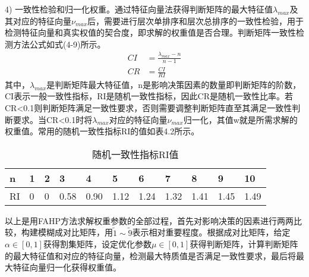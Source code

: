 4) 一致性检验和归一化权重。通过特征向量法获得判断矩阵的最大特征值$\lambda_{max}$及其对应的特征向量$\nu_{max}$后，需要进行层次单排序和层次总排序的一致性检验，用于检测特征向量和真实权值的契合度，即求解的权重值是否合理。判断矩阵一致性检测方法公式如式(4-9)所示。
\begin{equation}
\begin{split}
CI &= \frac{\lambda_{max}-n}{n-1} \\
CR &= \frac{CI}{RI}
\end{split}
\end{equation}
其中，$\lambda_{max}$是判断矩阵最大特征值，n是影响决策因素的数量即判断矩阵的阶数，CI表示一般一致性指标，RI是随机一致性指标，因此CR是随机一致性比率。若CR<0.1则判断矩阵满足一致性要求，否则需要调整判断矩阵直至其满足一致性判断要求。当CR<0.1时将$\lambda_{max}$对应的特征向量$\nu_{max}$归一化，其值w就是所需求解的权重值。常用的随机一致性指标RI的值如表4.2所示。
\begin{table}[htbp]
	\centering\dawu[1.3]
	\caption{随机一致性指标RI值}
	\begin{tabular}{|p{0.8cm}<{\centering}|p{0.8cm}<{\centering}|p{0.8cm}<{\centering}|p{0.8cm}<{\centering}|p{0.8cm}<{\centering}|p{0.8cm}<{\centering}|p{0.8cm}<{\centering}|p{0.8cm}<{\centering}|p{0.8cm}<{\centering}|p{0.8cm}<{\centering}|p{0.8cm}<{\centering}|} \hline
	n & 1 & 2 & 3 & 4 & 5 & 6 & 7 & 8 & 9 & 10 \\ \hline
	RI & 0 & 0 & 0.58 & 0.90 & 1.12 & 1.24 & 1.32 & 1.41 & 1.45 & 1.49 \\ \hline
	\end{tabular}
\end{table}

以上是用FAHP方法求解权重参数的全部过程，首先对影响决策的因素进行两两比较，构建模糊成对比矩阵，用$\widetilde{1}\sim \widetilde{9}$表示相对重要程度。根据成对比矩阵，给定$\alpha\in[0,1]$获得割集矩阵，设定优化参数$\mu \in[0,1]$获得判断矩阵，计算判断矩阵的最大特征值和对应的特征向量，检测最大特质值是否满足一致性要求，最后将最大特征向量归一化获得权重值。

